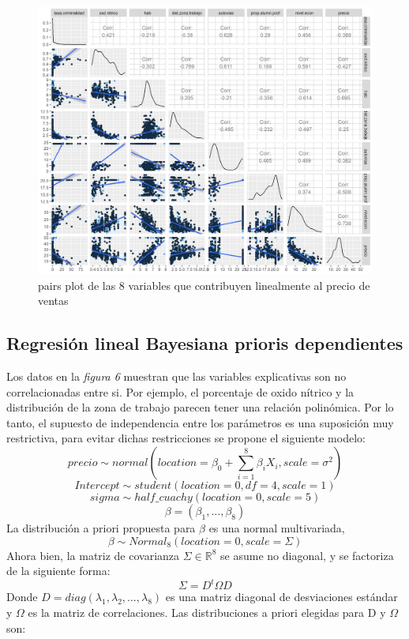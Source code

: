 \documentclass[nojss]{jss}
\begin{document}
\begin{figure}[H]
	\centering
	\includegraphics[scale=1]{images/pairs3-1}
	\caption[pairs]{pairs plot de las 8 variables que contribuyen linealmente al precio de ventas}
	\label{fig:fig6}
\end{figure}

\subsection{Regresi\'on lineal Bayesiana prioris dependientes}

Los datos en la \textit{figura 6} muestran que las variables explicativas son no correlacionadas entre si. Por ejemplo, el porcentaje de oxido nítrico y la distribución de la zona de trabajo parecen tener una relación polinómica. Por lo tanto, el supuesto de independencia entre los parámetros es una suposición muy restrictiva, para evitar dichas restricciones se propone el siguiente modelo:
$$ precio \sim normal(location = \beta_0+ \sum_{i=1}^{8}\beta_i X_i,scale =  \sigma^2)$$
$$Intercept \sim student(location = 0,df = 4,scale =1)$$
$$sigma \sim half\_cuachy(location = 0,scale =5)$$
$$\beta = (\beta_1,...,\beta_{8})$$ 
La distribución a priori propuesta para $\beta$ es una normal multivariada,
$$\beta \sim Normal_8(location = 0,scale = \Sigma)$$
Ahora bien, la matriz de covarianza $\Sigma \in \mathbb{R}^{8}$ se asume no diagonal, y se factoriza de la siguiente forma:
$$\Sigma = D^t\Omega D$$
Donde  $D = diag(\lambda_1,\lambda_2,...,\lambda_{8})$ es una matriz diagonal de desviaciones estándar y $\Omega$ es la matriz de correlaciones. Las distribuciones a  priori elegidas para D y $\Omega$ son:
\end{document}
